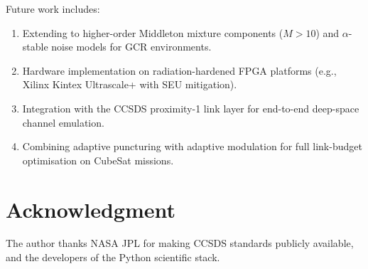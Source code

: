 \documentclass[journal,twocolumn]{IEEEtran}
\begin{document}
Future work includes:
\begin{enumerate}
  \item Extending to higher-order Middleton mixture components ($M>10$)
    and $\alpha$-stable noise models for GCR environments.
  \item Hardware implementation on radiation-hardened FPGA platforms
    (e.g., Xilinx Kintex Ultrascale+ with SEU mitigation).
  \item Integration with the CCSDS proximity-1 link layer for end-to-end
    deep-space channel emulation.
  \item Combining adaptive puncturing with adaptive modulation for
    full link-budget optimisation on CubeSat missions.
\end{enumerate}

\section*{Acknowledgment}
The author thanks NASA JPL for making CCSDS standards publicly
available, and the developers of the Python scientific stack.

\balance


\end{document}

